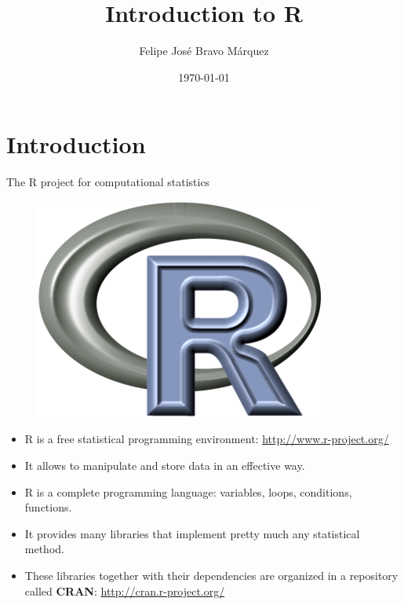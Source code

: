 \documentclass[handout]{beamer}
\title{Introduction to R}
\author[Felipe Bravo Márquez]{\footnotesize
 \textcolor[rgb]{0.00,0.00,1.00}{Felipe José Bravo Márquez}}
\date{ \today }
\begin{document}
\begin{frame}
\titlepage


\end{frame}




\section{Introduction}




\begin{frame}{The R project for computational statistics}
\begin{figure}[h!]
	\centering
	\includegraphics[scale=0.6]{pics/Rlogo.png}
\end{figure}
\scriptsize{
\begin{itemize}
 \item R is a free statistical programming environment: \url{http://www.r-project.org/}
 \item It allows to manipulate and store data in an effective way.
 \item R is a complete programming language: variables, loops, conditions, functions.
 \item It provides many libraries that implement pretty much any statistical method.
 \item These libraries together with their dependencies are organized in a repository called \textbf{CRAN}: \url{http://cran.r-project.org/}



\end{itemize}

}



\end{frame}
\end{document}

